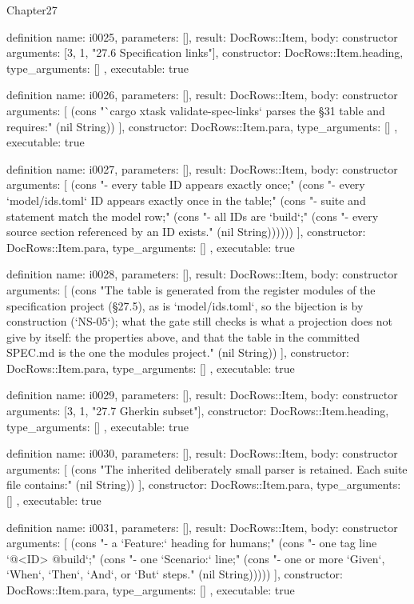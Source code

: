\begin{lexlean}{Chapter27}
\begin{semanticmodule}
definition{
  name: i0025,
  parameters: [],
  result: DocRows::Item,
  body: constructor{
    arguments: [3, 1, "27.6 Specification links"],
    constructor: DocRows::Item.heading,
    type_arguments: []
  },
  executable: true
}

definition{
  name: i0026,
  parameters: [],
  result: DocRows::Item,
  body: constructor{
    arguments: [
      (cons "`cargo xtask validate-spec-links` parses the §31 table and requires:" (nil String))
    ],
    constructor: DocRows::Item.para,
    type_arguments: []
  },
  executable: true
}

definition{
  name: i0027,
  parameters: [],
  result: DocRows::Item,
  body: constructor{
    arguments: [
      (cons "- every table ID appears exactly once;" (cons "- every `model/ids.toml` ID appears exactly once in the table;" (cons "- suite and statement match the model row;" (cons "- all IDs are `build`;" (cons "- every source section referenced by an ID exists." (nil String))))))
    ],
    constructor: DocRows::Item.para,
    type_arguments: []
  },
  executable: true
}

definition{
  name: i0028,
  parameters: [],
  result: DocRows::Item,
  body: constructor{
    arguments: [
      (cons "The table is generated from the register modules of the specification project (§27.5), as is `model/ids.toml`, so the bijection is by construction (`NS-05`); what the gate still checks is what a projection does not give by itself: the properties above, and that the table in the committed SPEC.md is the one the modules project." (nil String))
    ],
    constructor: DocRows::Item.para,
    type_arguments: []
  },
  executable: true
}

definition{
  name: i0029,
  parameters: [],
  result: DocRows::Item,
  body: constructor{
    arguments: [3, 1, "27.7 Gherkin subset"],
    constructor: DocRows::Item.heading,
    type_arguments: []
  },
  executable: true
}

definition{
  name: i0030,
  parameters: [],
  result: DocRows::Item,
  body: constructor{
    arguments: [
      (cons "The inherited deliberately small parser is retained. Each suite file contains:" (nil String))
    ],
    constructor: DocRows::Item.para,
    type_arguments: []
  },
  executable: true
}

definition{
  name: i0031,
  parameters: [],
  result: DocRows::Item,
  body: constructor{
    arguments: [
      (cons "- a `Feature:` heading for humans;" (cons "- one tag line `@<ID> @build`;" (cons "- one `Scenario:` line;" (cons "- one or more `Given`, `When`, `Then`, `And`, or `But` steps." (nil String)))))
    ],
    constructor: DocRows::Item.para,
    type_arguments: []
  },
  executable: true
}


\end{semanticmodule}
\end{lexlean}
